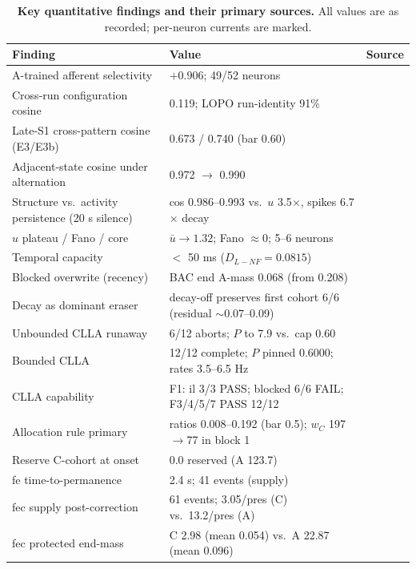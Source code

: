 \begin{table}[t]
\centering
\caption{\textbf{Key quantitative findings and their primary sources.}
All values are as recorded; per-neuron currents are marked.}
\label{tab:findings}
\small
\begin{tabular}{p{6.2cm}p{6.2cm}l}
\toprule
Finding & Value & Source \\
\midrule
A-trained afferent selectivity & \(+0.906\); 49/52 neurons & \cite{synmem} \\
Cross-run configuration cosine & 0.119; LOPO run-identity 91\% & \cite{synmem} \\
Late-S1 cross-pattern cosine (E3/E3b) & 0.673 / 0.740 (bar 0.60) & \cite{e3proto,e3bproto} \\
Adjacent-state cosine under alternation & 0.972 \(\to\) 0.990 & \cite{synmem} \\
Structure vs.\ activity persistence (20 s silence) & cos 0.986--0.993 vs.\ \(u\) 3.5\(\times\), spikes 6.7\(\times\) decay & \cite{synmem} \\
\(u\) plateau / Fano / core & \(\bar u\to 1.32\); Fano \(\approx 0\); 5--6 neurons & \cite{infoaudit} \\
Temporal capacity & \(<\) 50 ms (\(D_{L{-}NF}=0.0815\)) & \cite{overview} \\
Blocked overwrite (recency) & BAC end A-mass 0.068 (from 0.208) & \cite{synmem} \\
Decay as dominant eraser & decay-off preserves first cohort 6/6 (residual \(\sim0.07\)--0.09) & \cite{overview} \\
Unbounded CLLA runaway & 6/12 aborts; \(P\) to 7.9 vs.\ cap 0.60 & \cite{cllarecord} \\
Bounded CLLA & 12/12 complete; \(P\) pinned 0.6000; rates 3.5--6.5 Hz & \cite{bbounded} \\
CLLA capability & F1: il 3/3 PASS; blocked 6/6 FAIL; F3/4/5/7 PASS 12/12 & \cite{capability} \\
Allocation rule primary & ratios 0.008--0.192 (bar 0.5); \(w_C\) 197\(\to\)77 in block 1 & \cite{rule} \\
Reserve C-cohort at onset & 0.0 reserved (A 123.7) & \cite{reserve} \\
fe time-to-permanence & 2.4 s; 41 events (supply) & \cite{fe} \\
fec supply post-correction & 61 events; 3.05/pres (C) vs.\ 13.2/pres (A) & \cite{fec} \\
fec protected end-mass & C 2.98 (mean 0.054) vs.\ A 22.87 (mean 0.096) & \cite{fec} \\

\end{tabular}
\end{table}
